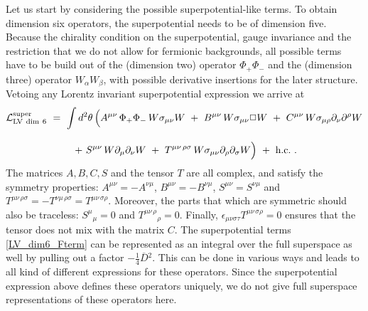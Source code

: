\documentclass[12pt]{revtex4}
\begin{document}
Let us start by considering the possible superpotential-like terms. 
To obtain dimension six operators, the superpotential needs to be of
dimension five. Because the chirality condition on the superpotential,
gauge invariance and the restriction that we do not allow for
fermionic backgrounds,  all possible terms have to be build out of the
(dimension two) operator $\Phi_+ \Phi_-$ and the (dimension three)
operator $W_\alpha W_\beta$, with possible derivative insertions for 
the later structure. Vetoing any Lorentz invariant superpotential
expression we arrive at 
\begin{gather} 
{\cal L}_{\rm{LV\ dim\ 6}}^{\rm{super}} ~=~ 
\int d^2 \theta \, \Big( 
A^{\mu\nu} \, \Phi_+ \Phi_-\, W \sigma_{\mu\nu} W ~+~ 
B^{\mu\nu} \, W \sigma_{\mu\nu} \Box W ~+~ 
C^{\mu\nu} \, W \sigma_{\mu\rho} \partial_\nu \partial^\rho W 
\nonumber \\[2ex]
~+~ 
S^{\mu\nu}\, W \partial_\mu \partial_\nu W ~+~ 
T^{\mu\nu\, \rho\sigma} \, 
W \sigma_{\mu\nu} \partial_\rho \partial_\sigma W 
\Big) ~+~ \text{h.c.}~. 
\label{LV_dim6_Fterm}
\end{gather}
The matrices $A, B, C, S$ and the tensor $T$ are all complex,
and satisfy the symmetry properties: $A^{\mu\nu} = -A^{\nu\mu}$, 
$B^{\mu\nu} = -B^{\nu\mu}$, 
$S^{\mu\nu} =S^{\nu\mu}$ and 
$T^{\mu\nu\, \rho\sigma} = -T^{\nu\mu\, \rho\sigma} = 
T^{\mu\nu\, \sigma\rho}$. Moreover, the parts that which are symmetric
should also be traceless: $S^\mu{}_\mu=0$ and 
$T^{\mu\nu\, \rho}{}_\rho = 0$. Finally,  
$\epsilon_{\mu\nu\sigma\tau}T^{\mu\nu\, \sigma\rho} = 0$ ensures that
the tensor does not mix with the matrix $C$. 
The superpotential terms \eqref{LV_dim6_Fterm} can be represented 
as an integral over the full superspace as well by pulling out a
factor $-\frac 14 \overline{D}{}^2$. This can be done in various ways
and leads to all kind of different expressions for these
operators. Since the superpotential expression above defines these 
operators uniquely, we do not give full superspace representations of
these operators here. 
\end{document}
